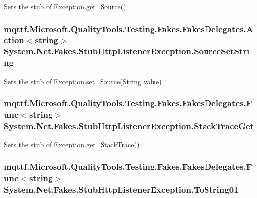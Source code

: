 Sets the stub of Exception.\-get\-\_\-\-Source()

\hypertarget{class_system_1_1_net_1_1_fakes_1_1_stub_http_listener_exception_aa02dd818c57075a312d73dc73114fc52}{
\subsubsection[{Source\-Set\-String}]{\setlength{\rightskip}{0pt plus 5cm}mqttf.\-Microsoft.\-Quality\-Tools.\-Testing.\-Fakes.\-Fakes\-Delegates.\-Action$<$string$>$ System.\-Net.\-Fakes.\-Stub\-Http\-Listener\-Exception.\-Source\-Set\-String}}\label{class_system_1_1_net_1_1_fakes_1_1_stub_http_listener_exception_aa02dd818c57075a312d73dc73114fc52}


Sets the stub of Exception.\-set\-\_\-\-Source(\-String value)

\hypertarget{class_system_1_1_net_1_1_fakes_1_1_stub_http_listener_exception_aa7a6ca669b8b8299948a5f87fccee540}{
\subsubsection[{Stack\-Trace\-Get}]{\setlength{\rightskip}{0pt plus 5cm}mqttf.\-Microsoft.\-Quality\-Tools.\-Testing.\-Fakes.\-Fakes\-Delegates.\-Func$<$string$>$ System.\-Net.\-Fakes.\-Stub\-Http\-Listener\-Exception.\-Stack\-Trace\-Get}}\label{class_system_1_1_net_1_1_fakes_1_1_stub_http_listener_exception_aa7a6ca669b8b8299948a5f87fccee540}


Sets the stub of Exception.\-get\-\_\-\-Stack\-Trace()

\hypertarget{class_system_1_1_net_1_1_fakes_1_1_stub_http_listener_exception_a77f8bc1a485f3fdc52e02d30f37e41e2}{
\subsubsection[{To\-String01}]{\setlength{\rightskip}{0pt plus 5cm}mqttf.\-Microsoft.\-Quality\-Tools.\-Testing.\-Fakes.\-Fakes\-Delegates.\-Func$<$string$>$ System.\-Net.\-Fakes.\-Stub\-Http\-Listener\-Exception.\-To\-String01}}\label{class_system_1_1_net_1_1_fakes_1_1_stub_http_listener_exception_a77f8bc1a485f3fdc52e02d30f37e41e2}


